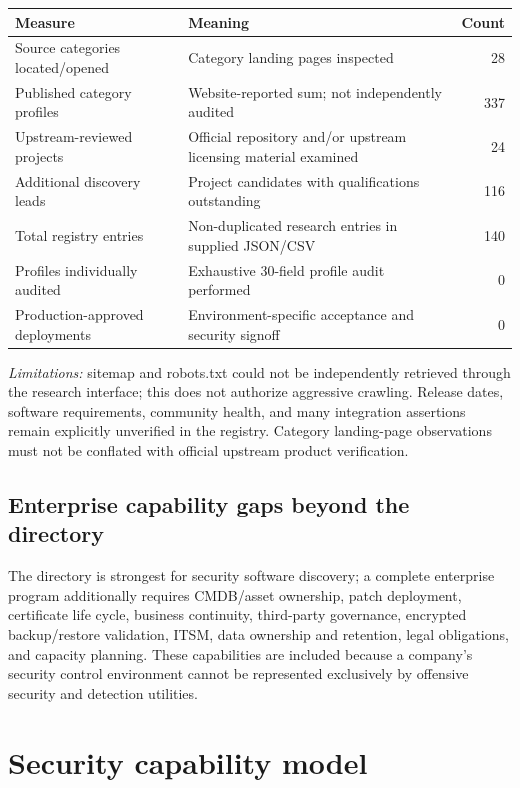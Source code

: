 \documentclass[11pt,oneside]{report}
\begin{document}
\noindent\begin{tabularx}{\textwidth}{lXr}
\toprule Measure & Meaning & Count\\\midrule
Source categories located/opened & Category landing pages inspected & 28\\
Published category profiles & Website-reported sum; not independently audited & 337\\
Upstream-reviewed projects & Official repository and/or upstream licensing material examined & 24\\
Additional discovery leads & Project candidates with qualifications outstanding & 116\\
Total registry entries & Non-duplicated research entries in supplied JSON/CSV & 140\\
Profiles individually audited & Exhaustive 30-field profile audit performed & 0\\
Production-approved deployments & Environment-specific acceptance and security signoff & 0\\
\bottomrule
\end{tabularx}
\par\textit{Limitations:} sitemap and robots.txt could not be independently retrieved through the research interface; this does not authorize aggressive crawling. Release dates, software requirements, community health, and many integration assertions remain explicitly unverified in the registry. Category landing-page observations must not be conflated with official upstream product verification.

\section{Enterprise capability gaps beyond the directory}
The directory is strongest for security software discovery; a complete enterprise program additionally requires CMDB/asset ownership, patch deployment, certificate life cycle, business continuity, third-party governance, encrypted backup/restore validation, ITSM, data ownership and retention, legal obligations, and capacity planning. These capabilities are included because a company's security control environment cannot be represented exclusively by offensive security and detection utilities.

\chapter{Security capability model}
\end{document}
